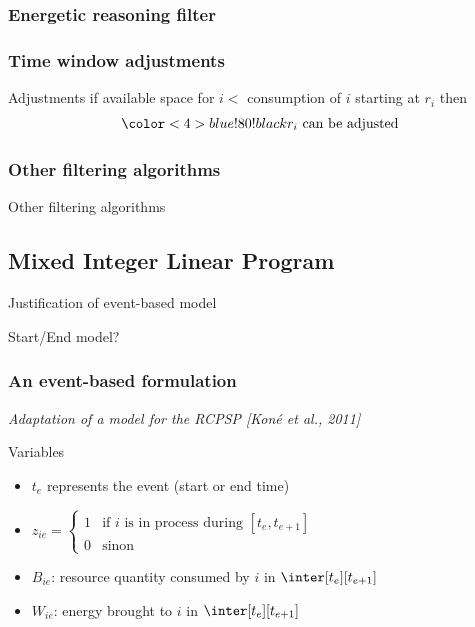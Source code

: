 \subsubsection{Energetic reasoning filter}

\begin{frame}
  \frametitle{Time window adjustments}
  \vspace{0.4cm}
  \begin{center}
    
  \end{center}
  \vfill
  \begin{block}{Adjustments}
    if { available space for $i$}$<${ consumption of $i$ starting at $r_i$}  then
    \[\color<4>{blue!80!black}r_i \text{ can be adjusted}\]
  \end{block}
  \vfill
\end{frame}

\subsubsection{Other filtering algorithms}
\begin{frame}{Other filtering algorithms}

\end{frame}
\subsection{Mixed Integer Linear Program}

\begin{frame}{Justification of event-based model}

\end{frame}
\begin{frame}{Start/End model?}

\end{frame}


\begin{frame}
  \frametitle{An event-based formulation}
  {\small \it Adaptation of a model for the RCPSP {\color{gray!50!black!50} \it [Koné et al., 2011]}}
  \vfill
  \begin{block}{Variables}
    \begin{itemize}
    \item  $t_e$ represents the event (start or end time)
      \vspace{0.3cm}
    \item $z_{ie}=\left\{
        \begin{array}{ll}
          1 & \text{if $i$ is in process during $[t_{e},t_{e+1}]$}\\
          0 & \text{sinon}
        \end{array}
      \right.
      $
      \vspace{0.3cm}
    \item $B_{ie}$: resource quantity consumed by $i$ in $\inter[t_e][t_{e+1}]$
      \vspace{0.3cm}
    \item $W_{ie}$: energy brought to $i$ in $\inter[t_e][t_{e+1}]$   
    \end{itemize}
  \end{block}
\end{frame}
